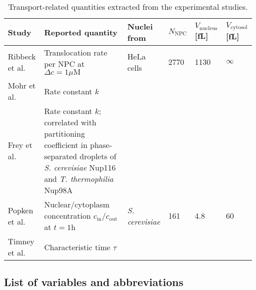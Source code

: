 \documentclass[10pt, a4paper, twocolumn]{article}
\newcommand{\todo}[1]{\pdfcomment{#1}} %
\begin{document}
\begin{table*}[h]
\begin{minipage}{\linewidth}
\centering
\caption{Transport-related quantities extracted from the experimental studies.}
\label{tbl:experimental}
\begin{tabular}{p{2.8cm}|p{7cm}|p{2cm}|p{1cm}|p{1cm}|p{1cm}}
Study & Reported quantity & Nuclei from & $N_\text{NPC}$ & $V_\text{nucleus}$ [fL] & $V_\text{cytosol}$ [fL] \\
\hline
Ribbeck et al. \cite{Ribbeck2001} & Translocation rate per NPC at $\Delta c = 1 \mu\text{M}$ & HeLa cells & 2770 & 1130 & $\infty$ \\
Mohr et al. \cite{Mohr2009} & Rate constant $k$ &  &  &  &  \\
Frey et al. \cite{Frey2018} & Rate constant $k$; \newline  correlated with partitioning coefficient in phase-separated droplets of  \textit{S. cerevisiae} Nup116 and \textit{T. thermophilia} Nup98A &  &  &  &  \\
\hline
Popken et al. \cite{Popken2015} & Nuclear/cytoplasm concentration $c_{\text{in}}/c_{\text{out}}$ at $t = 1 \text{h}$ & \textit{S. cerevisiae} & 161 & 4.8 & 60 \\
Timney et al. \cite{Timney2016} & Characteristic time $\tau$ &  &  &  &  \\
\end{tabular}
\end{minipage}
\end{table*}


\pagebreak
\onecolumn
\subsection*{List of variables and abbreviations}
\todo{TO BE REVISED}
\end{document}
